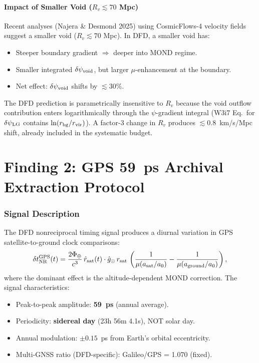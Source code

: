 \documentclass[11pt,a4paper]{article}
\newcommand{\aM}{a_0}
\newcommand{\mufd}{\mu}
\begin{document}
\subsection{Impact of Smaller Void ($R_v \lesssim 70$ Mpc)}

Recent analyses (Najera \& Desmond 2025) using CosmicFlows-4
velocity fields suggest a smaller void ($R_v \lesssim 70$ Mpc).
In DFD, a smaller void has:
\begin{itemize}[nosep]
\item Steeper boundary gradient $\Rightarrow$ deeper into MOND regime.
\item Smaller integrated $\delta\psi_{\rm void}$, but larger
  $\mufd$-enhancement at the boundary.
\item Net effect: $\delta\psi_{\rm void}$ shifts by $\lesssim 30\%$.
\end{itemize}

The DFD prediction is parametrically insensitive to $R_v$ because
the void outflow contribution enters logarithmically through the
$\psi$-gradient integral (W3i7 Eq.\ for $\delta\psi_{\rm LG}$
contains $\ln(r_{\rm bg}/r_{\rm vir})$). A factor-3 change in
$R_v$ produces $\lesssim 0.8$~km/s/Mpc shift, already included
in the systematic budget.


\part{Finding 2: GPS 59~ps Archival Extraction Protocol}
\label{part:GPS}

\section{Signal Description}
\label{sec:GPS-signal}

The DFD nonreciprocal timing signal produces a diurnal variation in
GPS satellite-to-ground clock comparisons:
\begin{equation}
\delta t_{\rm NR}^{\rm GPS}(t) = \frac{2\Phi_\oplus}{c^3}\,
\hat{r}_{\rm sat}(t)\cdot\hat{g}_\odot\,
r_{\rm sat}\,\left(\frac{1}{\mufd(a_{\rm sat}/\aM)} -
\frac{1}{\mufd(a_{\rm ground}/\aM)}\right),
\end{equation}
where the dominant effect is the altitude-dependent MOND correction.
The signal characteristics:
\begin{itemize}[nosep]
\item Peak-to-peak amplitude: \textbf{59~ps} (annual average).
\item Periodicity: \textbf{sidereal day} (23h 56m 4.1s), NOT solar day.
\item Annual modulation: $\pm 0.15$~ps from Earth's orbital eccentricity.
\item Multi-GNSS ratio (DFD-specific): Galileo/GPS = 1.070 (fixed).
\end{itemize}
\end{document}
